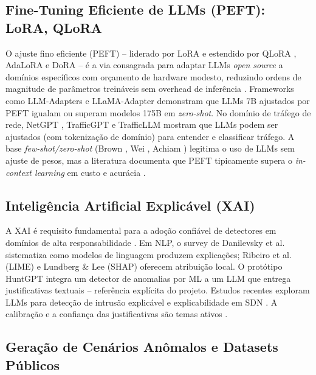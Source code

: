 \documentclass[12pt,a4paper]{article}
\begin{document}
\subsection{Fine-Tuning Eficiente de LLMs (PEFT): LoRA, QLoRA}
\label{sec:peft}

O ajuste fino eficiente (PEFT) -- liderado por LoRA \cite{rA41} e estendido por QLoRA
\cite{rA42}, AdaLoRA \cite{rA43} e DoRA \cite{rA44} -- é a via consagrada para adaptar LLMs
\textit{open source} a domínios específicos com orçamento de hardware modesto,
reduzindo ordens de magnitude de parâmetros treináveis sem overhead de
inferência \cite{rA45}\cite{rA49}\cite{rA415}. Frameworks como LLM-Adapters \cite{rA411} e
LLaMA-Adapter \cite{rA412} demonstram que LLMs 7B ajustados por PEFT igualam ou
superam modelos 175B em \textit{zero-shot}. No domínio de tráfego de rede,
NetGPT \cite{rA425}, TrafficGPT \cite{rA426} e TrafficLLM \cite{rA427} mostram que LLMs podem ser
ajustados (com tokenização de domínio) para entender e classificar tráfego. A
base \textit{few-shot/zero-shot} (Brown \cite{rA422}, Wei \cite{rA321}, Achiam \cite{rA424})
legitima o uso de LLMs sem ajuste de pesos, mas a literatura documenta que
PEFT tipicamente supera o \textit{in-context learning} em custo e acurácia
\cite{rA49}.

\subsection{Inteligência Artificial Explicável (XAI)}
\label{sec:xai}

A XAI é requisito fundamental para a adoção confiável de detectores em domínios
de alta responsabilidade \cite{rA52}\cite{rA531}\cite{rA517}. Em NLP, o survey de Danilevsky et
al. \cite{rA51} sistematiza como modelos de linguagem produzem explicações; Ribeiro
et al. \cite{rA53} (LIME) e Lundberg \& Lee \cite{rA54} (SHAP) oferecem atribuição local.
O protótipo HuntGPT \cite{rA511} integra um detector de anomalias por ML a um LLM
que entrega justificativas textuais -- referência explícita do projeto. Estudos
recentes exploram LLMs para detecção de intrusão explicável \cite{rA520}\cite{rA521} e
explicabilidade em SDN \cite{rA522}. A calibração e a confiança das justificativas
são temas ativos \cite{rA531}\cite{rA532}\cite{rA533}\cite{rA534}.

\subsection{Geração de Cenários Anômalos e Datasets Públicos}
\label{sec:datasets}
\end{document}
